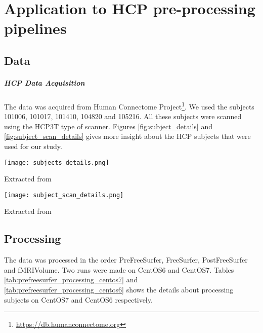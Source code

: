 \chapter{Application to HCP pre-processing pipelines}

\section{Data}
\paragraph{HCP Data Acquisition}
The data was acquired from Human Connectome Project\footnote{\url{https://db.humanconnectome.org}}. We used the subjects 101006, 101017, 101410, 104820 and 105216. All these subjects were scanned using the HCP3T type of scanner. Figures \ref{fig:subject_details} and \ref{fig:subject_scan_details} gives more insight about the HCP subjects that were used for our study. 

\begin{center}
\texttt{[image: subjects\_details.png]}
\label{fig:subject_details}
\caption*{Extracted from \cite{DBConnectomeSite}}
\end{center}

\begin{center}
\texttt{[image: subject\_scan\_details.png]}
\label{fig:subject_scan_details}
\caption*{Extracted from \cite{DBConnectomeSite}}
\end{center}

\section{Processing}
The data was processed in the order PreFreeSurfer, FreeSurfer, PostFreeSurfer and fMRIVolume.
Two runs were made on CentOS6 and CentOS7. Tables \ref{tab:prefreesurfer_processing_centos7} and \ref{tab:prefreesurfer_processing_centos6} shows the details about processing subjects on CentOS7 and CentOS6 respectively.

